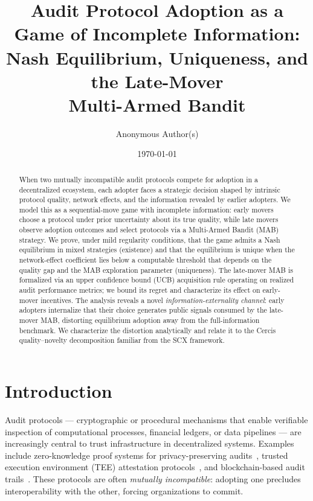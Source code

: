 \documentclass[12pt,a4paper]{article}
\title{\bfseries Audit Protocol Adoption as a Game of Incomplete Information:\\
Nash Equilibrium, Uniqueness, and the Late-Mover\\
Multi-Armed Bandit}
\author{Anonymous Author(s)}
\date{\today}
\begin{document}
\maketitle

\begin{abstract}
When two mutually incompatible audit protocols compete for adoption in a
decentralized ecosystem, each adopter faces a strategic decision shaped by
intrinsic protocol quality, network effects, and the information revealed
by earlier adopters.  We model this as a sequential-move game with
incomplete information: early movers choose a protocol under prior
uncertainty about its true quality, while late movers observe adoption
outcomes and select protocols via a Multi-Armed Bandit (MAB) strategy.
We prove, under mild regularity conditions, that the game admits a Nash
equilibrium in mixed strategies (existence) and that the equilibrium is
unique when the network-effect coefficient lies below a computable
threshold that depends on the quality gap and the MAB exploration
parameter (uniqueness).  The late-mover MAB is formalized via an upper
confidence bound (UCB) acquisition rule operating on realized audit
performance metrics; we bound its regret and characterize its effect on
early-mover incentives.  The analysis reveals a novel
\emph{information-externality channel}: early adopters internalize that
their choice generates public signals consumed by the late-mover MAB,
distorting equilibrium adoption away from the full-information benchmark.
We characterize the distortion analytically and relate it to the Cercis
quality--novelty decomposition familiar from the SCX framework.
\end{abstract}

\section{Introduction}

Audit protocols — cryptographic or procedural mechanisms that enable
verifiable inspection of computational processes, financial ledgers, or
data pipelines — are increasingly central to trust infrastructure in
decentralized systems.  Examples include zero-knowledge proof systems for
privacy-preserving audits~\citep{goldwasser1989knowledge}, trusted execution
environment (TEE) attestation protocols~\citep{costan2016intel}, and
blockchain-based audit trails~\citep{nakamoto2008bitcoin}.  These protocols
are often \emph{mutually incompatible}: adopting one precludes interoperability
with the other, forcing organizations to commit.
\end{document}
